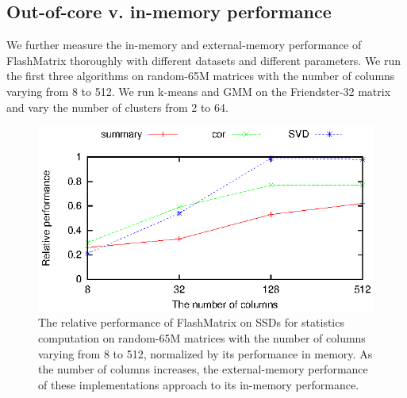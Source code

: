 \vspace{-8pt}
\subsection{Out-of-core v. in-memory performance}
\vspace{-4pt}

We further measure the in-memory and external-memory performance of FlashMatrix
thoroughly with different datasets and different parameters. We run the first
three algorithms on random-65M matrices
with the number of columns varying from 8 to 512. We run k-means
and GMM on the Friendster-32 matrix and vary the number of clusters from 2 to 64.

\begin{figure}
	\begin{center}
		\footnotesize
		\includegraphics{FlashMatrix_figs/IM-vs-EM-stat.eps}
		\caption{The relative performance of FlashMatrix on SSDs for
			statistics computation on random-65M matrices with the number of
			columns varying from 8 to 512, normalized by its performance
			in memory. As the number of columns increases, the external-memory
			performance of these implementations approach to its in-memory
		performance.}
		\label{perf:stat}
	\end{center}
\end{figure}

